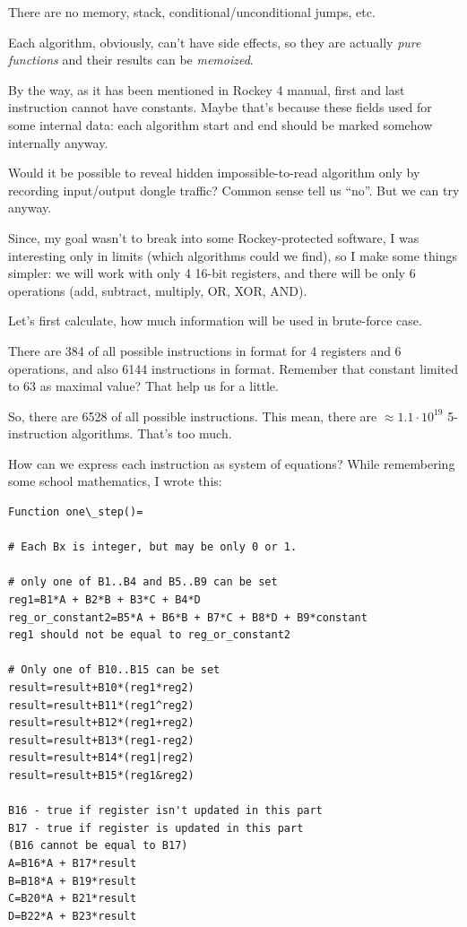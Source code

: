 There are no memory, stack, conditional/unconditional jumps, etc.

Each algorithm, obviously, can't have side effects, so they are actually \textit{pure functions}
and their results can be \textit{memoized}.

By the way, as it has been mentioned in Rockey 4 manual, first and last instruction cannot have constants.
Maybe that's because these fields used for some internal data:
each algorithm start and end should be marked somehow internally anyway.

Would it be possible to reveal hidden impossible-to-read algorithm only by recording input/output dongle traffic?
Common sense tell us ``no''. But we can try anyway.

Since, my goal wasn't to break into some Rockey-protected software,
I was interesting only in limits (which algorithms could we find),
so I make some things simpler: we will work with only 4 16-bit registers,
and there will be only 6 operations (add, subtract, multiply, OR, XOR, AND).

Let's first calculate, how much information will be used in brute-force case.

There are 384 of all possible instructions in  format for 4 registers and 6 operations,
and also 6144 instructions in  format.
Remember that constant limited to 63 as maximal value? That help us for a little.

So, there are 6528 of all possible instructions.
This mean, there are $\approx 1.1 \cdot 10^{19}$ 5-instruction algorithms.
That's too much.

How can we express each instruction as system of equations?
While remembering some school mathematics, I wrote this:

\begin{lstlisting}
Function one\_step()=

# Each Bx is integer, but may be only 0 or 1.

# only one of B1..B4 and B5..B9 can be set
reg1=B1*A + B2*B + B3*C + B4*D
reg_or_constant2=B5*A + B6*B + B7*C + B8*D + B9*constant
reg1 should not be equal to reg_or_constant2

# Only one of B10..B15 can be set
result=result+B10*(reg1*reg2)
result=result+B11*(reg1^reg2)
result=result+B12*(reg1+reg2)
result=result+B13*(reg1-reg2)
result=result+B14*(reg1|reg2)
result=result+B15*(reg1&reg2)

B16 - true if register isn't updated in this part
B17 - true if register is updated in this part
(B16 cannot be equal to B17)
A=B16*A + B17*result
B=B18*A + B19*result
C=B20*A + B21*result
D=B22*A + B23*result
\end{lstlisting}


